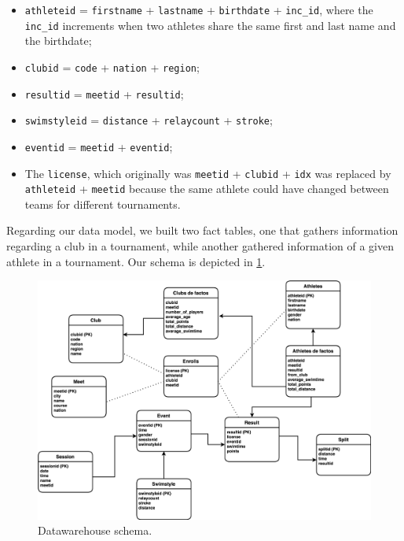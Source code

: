 \documentclass[a4paper, 11pt]{article}
\begin{document}
\begin{itemize}
    \item \texttt{athleteid} = \texttt{firstname} + \texttt{lastname} + \texttt{birthdate} + \texttt{inc\_id}, where the \texttt{inc\_id} increments when two athletes share the same first and last name and the birthdate;
    \item \texttt{clubid} = \texttt{code} + \texttt{nation} + \texttt{region};
    \item \texttt{resultid} = \texttt{meetid} + \texttt{resultid};
    \item \texttt{swimstyleid} = \texttt{distance} + \texttt{relaycount} + \texttt{stroke};
    \item \texttt{eventid} = \texttt{meetid} + \texttt{eventid};
    \item The \texttt{license}, which originally was \texttt{meetid} + \texttt{clubid} + \texttt{idx} was replaced by \texttt{athleteid} + \texttt{meetid} because the same athlete could have changed between teams for different tournaments.
\end{itemize}

Regarding our data model, we built two fact tables, one that gathers information regarding a club in a tournament, while another gathered information of a given athlete in a tournament. Our schema is depicted in \cref{fig:defact}. 

\begin{figure}[ht]
    \centering
    \includegraphics[width=\textwidth]{report/img/datawarehouse.png}
    \caption{Datawarehouse schema.}
    \label{fig:defact}
\end{figure}
\end{document}
